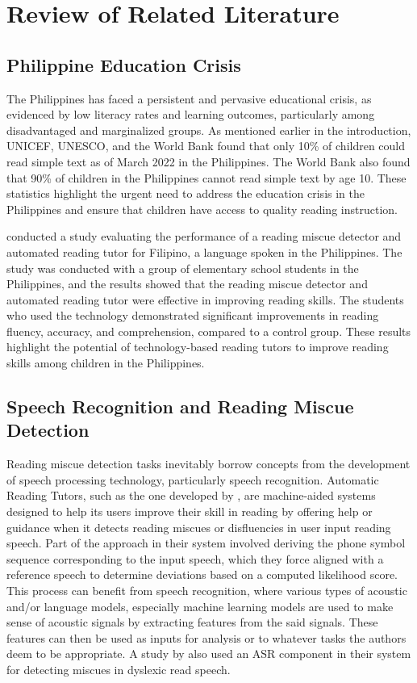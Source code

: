 \chapter{Review of Related Literature}
\label{sec:relatedlit}

\section{Philippine Education Crisis}
The Philippines has faced a persistent and pervasive educational crisis, as evidenced by low literacy rates and learning outcomes, particularly among disadvantaged and marginalized groups. As mentioned earlier in the introduction, UNICEF, UNESCO, and the World Bank found that only 10\% of children could read simple text as of March 2022 in the Philippines. The World Bank also found that 90\% of children in the Philippines cannot read simple text by age 10. These statistics highlight the urgent need to address the education crisis in the Philippines and ensure that children have access to quality reading instruction.

\citeauthor{pascual-2017} \citeyear{pascual-2017} conducted a study evaluating the performance of a reading miscue detector and automated reading tutor for Filipino, a language spoken in the Philippines. The study was conducted with a group of elementary school students in the Philippines, and the results showed that the reading miscue detector and automated reading tutor were effective in improving reading skills. The students who used the technology demonstrated significant improvements in reading fluency, accuracy, and comprehension, compared to a control group. These results highlight the potential of technology-based reading tutors to improve reading skills among children in the Philippines.


\section{Speech Recognition and Reading Miscue Detection}
Reading miscue detection tasks inevitably borrow concepts from the development of speech processing technology, particularly speech recognition. Automatic Reading Tutors, such as the one developed by \citeauthor{pascual-2017} \citeyear{pascual-2017}, are machine-aided systems designed to help its users improve their skill in reading by offering help or guidance when it detects reading miscues or disfluencies in user input reading speech. Part of the approach in their system involved deriving the phone symbol sequence corresponding to the input speech, which they force aligned with a reference speech to determine deviations based on a computed likelihood score. This process can benefit from speech recognition, where various types of acoustic and/or language models, especially machine learning models are used to make sense of acoustic signals by extracting features from the said signals. These features can then be used as inputs for analysis or to whatever tasks the authors deem to be appropriate. A study by \citeauthor{rasmussen-2009} \citeyear{rasmussen-2009} also used an ASR component in their system for detecting miscues in dyslexic read speech.

